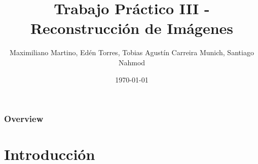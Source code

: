 \documentclass{beamer}
\title[TP3]{Trabajo Práctico III - Reconstrucción de Imágenes } %
\author[Carreira-Torres-Martino-Nahmod]{Maximiliano Martino, Edén Torres, Tobias Agustín Carreira Munich, Santiago Nahmod} %
\institute[FCEyN] %
{
Facultad de Ciencias Exactas y Naturales, UBA \\ %
\medskip
}
\date{\today} %
\begin{document}
\begin{frame}
\titlepage %
\end{frame}

\begin{frame}
\frametitle{Overview} %
\tableofcontents %
\end{frame}


\section{Introducción} %
\end{document}
